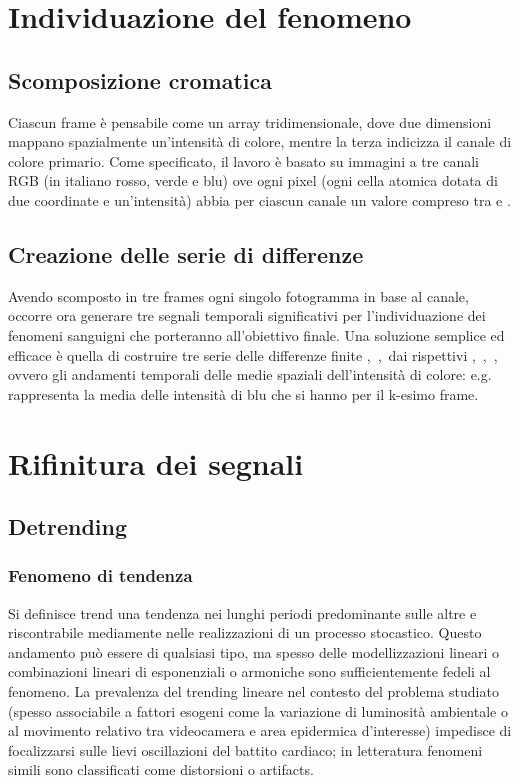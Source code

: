 \section{Individuazione del fenomeno} %
	\subsection{Scomposizione cromatica}
Ciascun frame è pensabile come un array tridimensionale, dove due dimensioni mappano spazialmente un'intensità di colore, mentre la terza indicizza il canale di colore primario. Come specificato, il lavoro è basato su immagini a tre canali RGB (in italiano  rosso, verde e blu) ove ogni pixel (ogni cella atomica dotata di due coordinate e un'intensità) abbia per ciascun canale un valore compreso tra  e .
	\subsection{Creazione delle serie di differenze}
Avendo scomposto in tre frames ogni singolo fotogramma in base al canale, occorre ora generare tre segnali temporali significativi per l'individuazione dei fenomeni sanguigni che porteranno all'obiettivo finale. Una soluzione semplice ed efficace è quella di costruire tre serie delle differenze finite ,\, ,\,  dai rispettivi ,\, ,\, , ovvero gli andamenti temporali delle medie spaziali dell'intensità di colore: e.g.  rappresenta la media delle intensità di blu che si hanno per il k-esimo frame.
\section{Rifinitura dei segnali} %
	\subsection{Detrending}	 %
		\subsubsection{Fenomeno di tendenza}
Si definisce trend una tendenza nei lunghi periodi predominante sulle altre e riscontrabile mediamente nelle realizzazioni di un processo stocastico. Questo andamento può essere di qualsiasi tipo, ma spesso delle modellizzazioni lineari o combinazioni lineari di esponenziali o armoniche sono sufficientemente fedeli al fenomeno. La prevalenza del trending lineare nel contesto del problema studiato (spesso associabile a fattori esogeni come la variazione di luminosità ambientale o al movimento relativo tra videocamera e area epidermica d'interesse) impedisce di focalizzarsi sulle lievi oscillazioni del battito cardiaco; in letteratura fenomeni simili sono classificati come distorsioni o artifacts.

